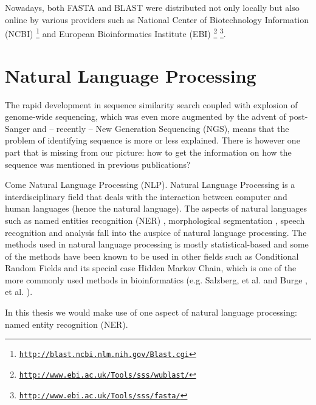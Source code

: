 Nowadays, both FASTA and BLAST were distributed not only locally but also online by various providers such as National Center of Biotechnology Information (NCBI) \footnote{\href{http://blast.ncbi.nlm.nih.gov/Blast.cgi}{\texttt{http://blast.ncbi.nlm.nih.gov/Blast.cgi}}} and European Bioinformatics Institute (EBI) \footnote{\href{http://www.ebi.ac.uk/Tools/sss/wublast/}{\texttt{http://www.ebi.ac.uk/Tools/sss/wublast/}}} \footnote{\href{http://www.ebi.ac.uk/Tools/sss/fasta/}{\texttt{http://www.ebi.ac.uk/Tools/sss/fasta/}}}.


\section{Natural Language Processing}

The rapid development in sequence similarity search coupled with explosion of genome-wide sequencing, which was even more augmented by the advent of post-Sanger and -- recently -- New Generation Sequencing (NGS), means that the problem of identifying sequence is more or less explained. There is however one part that is missing from our picture: how to get the information on how the sequence was mentioned in previous publications?

Come Natural Language Processing (NLP). Natural Language Processing is a interdisciplinary field that deals with the interaction between computer and human languages (hence the natural language). The aspects of natural languages such as named entities recognition (NER) \citep{nadeau2007survey}, morphological segmentation \citep{meyer1990morphological}, speech recognition and analysis \citep{rabiner1993fundamentals} fall into the auspice of natural language processing. The methods used in natural language processing is mostly statistical-based \citep{manning1999foundations} and some of the methods have been known to be used in other fields such as Conditional Random Fields \citep{sutton2006introduction} and its special case Hidden Markov Chain, which is one of the more commonly used methods in bioinformatics (e.g. Salzberg, et al. \citep{salzberg1998microbial} and Burge , et al. \citep{burge1998modeling}).

In this thesis we would make use of one aspect of natural language processing: named entity recognition (NER).

